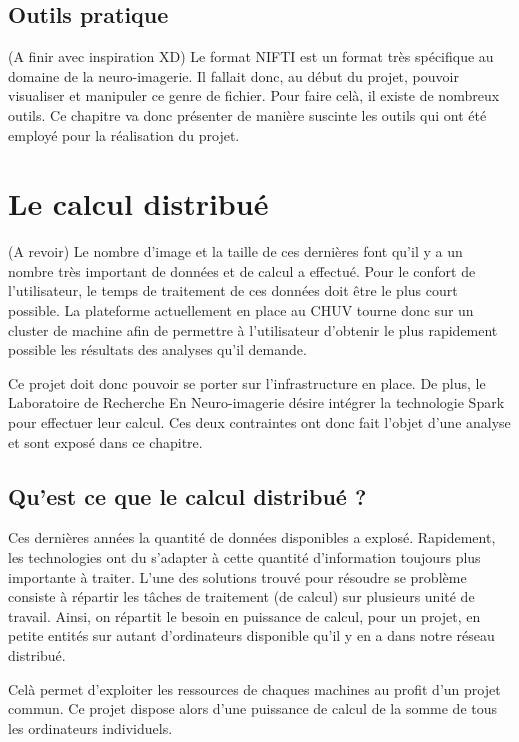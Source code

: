 \documentclass[a4paper,10pt,openany,oneside]{sphinxmanual}
\begin{document}
\subsection{Outils pratique}
\label{index:outils-pratique}
(A finir avec inspiration XD)
Le format NIFTI est un format très spécifique au domaine de la neuro-imagerie. Il fallait donc, au début
du projet, pouvoir visualiser et manipuler ce genre de fichier. Pour faire celà, il existe de nombreux outils.
Ce chapitre va donc présenter de manière suscinte les outils qui ont été employé pour la réalisation du projet.


\section{Le calcul distribué}
\label{index:le-calcul-distribue}
(A revoir)
Le nombre d'image et la taille de ces dernières font qu'il y a un nombre très important de données et de calcul a effectué.
Pour le confort de l'utilisateur, le temps de traitement de ces données doit être le plus court possible. La plateforme
actuellement en place au CHUV tourne donc sur un cluster de machine afin de permettre à l'utilisateur d'obtenir le plus rapidement
possible les résultats des analyses qu'il demande.

Ce projet doit donc pouvoir se porter sur l'infrastructure en place. De plus, le Laboratoire de Recherche En Neuro-imagerie désire
intégrer la technologie Spark pour effectuer leur calcul. Ces deux contraintes ont donc fait l'objet d'une analyse et sont exposé
dans ce chapitre.


\subsection{Qu'est ce que le calcul distribué ?}
\label{index:qu-est-ce-que-le-calcul-distribue}
Ces dernières années la quantité de données disponibles a explosé. Rapidement, les technologies ont du s'adapter à cette quantité
d'information toujours plus importante à traiter. L'une des solutions trouvé pour résoudre se problème consiste à répartir les tâches
de traitement (de calcul) sur plusieurs unité de travail. Ainsi, on répartit le besoin en puissance de calcul, pour un projet, en
petite entités sur autant d'ordinateurs disponible qu'il y en a dans notre réseau distribué.

Celà permet d'exploiter les ressources de chaques machines au profit d'un projet commun. Ce projet dispose alors d'une puissance de
calcul de la somme de tous les ordinateurs individuels.
\end{document}
